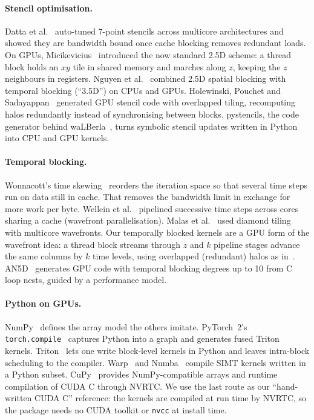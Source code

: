\documentclass[11pt]{article}
\newcommand{\code}[1]{\texttt{#1}}
\begin{document}
\paragraph{Stencil optimisation.}
Datta et al.~\cite{datta2008stencil} auto-tuned 7-point stencils across multicore
architectures and showed they are bandwidth bound once cache blocking removes redundant
loads. On GPUs, Micikevicius~\cite{micikevicius2009fd} introduced the now standard 2.5D scheme:
a thread block holds an $xy$ tile in shared memory and marches along $z$, keeping the $z$
neighbours in registers. Nguyen et al.~\cite{nguyen2010blocking} combined 2.5D spatial
blocking with temporal blocking (``3.5D'') on CPUs and GPUs. Holewinski, Pouchet and
Sadayappan~\cite{holewinski2012stencil} generated GPU stencil code with overlapped tiling,
recomputing halos redundantly instead of synchronising between blocks. pystencils, the code
generator behind waLBerla~\cite{bauer2019pystencils,bauer2021walberla}, turns symbolic stencil
updates written in Python into CPU and GPU kernels.

\paragraph{Temporal blocking.}
Wonnacott's time skewing~\cite{wonnacott2000timeskewing} reorders the iteration space so that
several time steps run on data still in cache. That removes the bandwidth limit in exchange for
more work per byte. Wellein et al.~\cite{wellein2009temporal} pipelined successive time steps
across cores sharing a cache (wavefront parallelisation). Malas et al.~\cite{malas2015diamond}
used diamond tiling with multicore wavefronts. Our temporally blocked kernels are a GPU form of
the wavefront idea: a thread block streams through $z$ and $k$ pipeline stages advance the same
columns by $k$ time levels, using overlapped (redundant) halos as
in~\cite{holewinski2012stencil}. AN5D~\cite{matsumura2020an5d} generates GPU code with
temporal blocking degrees up to 10 from C loop nests, guided by a performance model.

\paragraph{Python on GPUs.}
NumPy~\cite{harris2020numpy} defines the array model the others imitate. PyTorch~2's
\code{torch.compile}~\cite{ansel2024pytorch2} captures Python into a graph and generates fused
Triton kernels. Triton~\cite{tillet2019triton} lets one write block-level kernels in Python and
leaves intra-block scheduling to the compiler. Warp~\cite{macklin2022warp} and
Numba~\cite{lam2015numba} compile SIMT kernels written in a Python subset. CuPy~\cite{okuta2017cupy}
provides NumPy-compatible arrays and runtime compilation of CUDA C through NVRTC. We use the
last route as our ``hand-written CUDA C'' reference: the kernels are compiled at run time by NVRTC, so the
package needs no CUDA toolkit or \code{nvcc} at install time.
\end{document}
